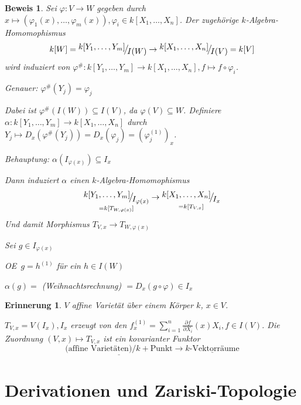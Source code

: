 \documentclass[a4paper, 12pt, numbers=noendperiod, chapterprefix=true]{scrbook}
\theoremstyle{break}
\theoremstyle{nonumberbreak}
\newtheorem{nnErinn}{Erinnerung}
\newtheorem{Bew}{Beweis}
\theoremstyle{nonumberplain}
\newcommand{\Sum}{\sum\limits}
\newcommand{\FakRaum}[2]{
  \raisebox{0.7ex}{\ensuremath{#1}}
  \ensuremath{\mkern-3mu}\big/\ensuremath{\mkern-3mu}
  \raisebox{-0.6ex}{\ensuremath{#2}}}
\renewcommand{\OE}{O\!\!E~}
\begin{document}
\begin{Bew}
Sei $\varphi:V\to W$ gegeben durch $x\mapsto(\varphi_1(x),\ldots ,\varphi_m(x)), \varphi_i\in k[X_1,\ldots ,X_n]$. Der zugeh\"orige $k$-Algebra-Homomophismus
	\[k[W]=\FakRaum{k[Y_1,\ldots ,Y_m]}{I(W)}\to \FakRaum{k[X_1,\ldots ,X_n]}{I(V)}=k[V]\]
wird induziert von $\varphi^\#:k[Y_1,\ldots ,Y_m]\to k[X_1,\ldots ,X_n], f\mapsto f\circ \varphi_i$.

\emph{Genauer:} $\varphi^\#(Y_j)=\varphi_j$

Dabei ist $\varphi^\#(I(W))\subseteq I(V)$, da $\varphi(V)\subseteq W$. Definiere $\alpha: k[Y_1,\ldots ,Y_m]\to k[X_1,\ldots ,X_n]$ durch $Y_j\mapsto D_x(\varphi^\#(Y_j))=D_x(\varphi_j)=(\varphi_j^{(1)})_x$.

\emph{Behauptung:} $\alpha(I_{\varphi(x)})\subseteq I_x$

Dann induziert $\alpha$ einen $k$-Algebra-Homomophismus
	\[ \underset{=k[T_{W,\varphi(x)}]}{\FakRaum{k[Y_1,\ldots ,Y_m]}{I_{\varphi(x)}}} \to \underset{=k[T_{V,x}]}{\FakRaum{k[X_1,\ldots ,X_n]}{I_x}} \]
Und damit Morphismus $T_{V,x}\to T_{W,\varphi(x)}$

\begin{description}[\setlabelstyle{\itshape}]
\item[Beweis der Behauptung:]
	Sei $g\in I_{\varphi(x)}$

	\OE $g=h^{(1)}$ f\"ur ein $h\in I(W)$

	$\alpha(g) =$ (Weihnachtsrechnung) $= D_x(g\circ \varphi)\in I_x$
\end{description}
\end{Bew}

\begin{nnErinn}
$V$ affine Variet\"at \"uber einem K\"orper $k$, $x\in V$.

$T_{V,x} =V(I_x), I_x$ erzeugt von den $f_x^{(1)}=\Sum_{i=1}^n\frac{\partial f}{\partial X_i}(x)X_i, f\in I(V)$. Die Zuordnung $(V,x)\mapsto T_{V,x}$ ist ein kovarianter Funktor
	\[ \underline{\text{(affine Variet\"aten)}/k + \text{Punkt}} \to \underline{k\text{-Vektorr\"aume}}\]
\end{nnErinn}

\newpage


\section{Derivationen und Zariski-Topologie}
\end{document}
